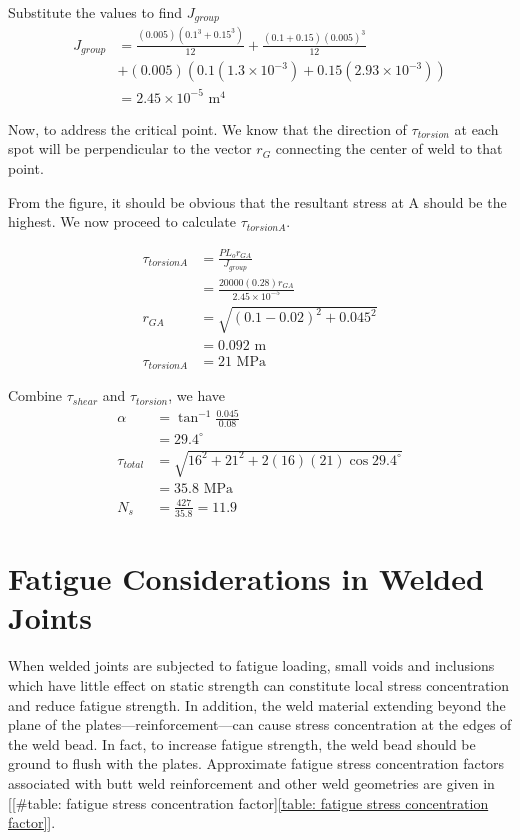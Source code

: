 \documentclass[a4paper,openany,12pt]{book}
\begin{document}
{{Substitute the values to find \(J_{group}\) $$\begin{aligned}
    J_{group} &= \frac{(0.005)(0.1^3 + 0.15^3)}{12} +\frac{(0.1 + 0.15)(0.005)^3}{12} \\
              &+ (0.005)(0.1(1.3 \times 10^{-3}) + 0.15(2.93 \times 10^{-3})) \\
              &= 2.45 \times 10^{-5} \text{ m}^4
  \end{aligned}$$

Now, to address the critical point. We know that the direction of
\(\tau_{torsion}\) at each spot will be perpendicular to the vector \(r_G\)
connecting the center of weld to that point.

From the figure, it should be obvious that the resultant stress at A
should be the highest. We now proceed to calculate \(\tau_{torsionA}\).

$$\begin{aligned}
    \tau_{torsionA} &= \frac{P L_o r_{GA}}{J_{group}} \\
                    &=\frac{20000(0.28) r_{GA}}{2.45 \times 10^{-5}} \\[1em]
    r_{GA} &= \sqrt{(0.1 - 0.02)^2 + 0.045^2} \\
                    &= 0.092 \text{ m} \\[1em]
    \tau_{torsionA} &= 21 \text{ MPa}
  \end{aligned}$$

Combine \(\tau_{shear}\) and \(\tau_{torsion}\), we have $$\begin{aligned}
    \alpha &= \tan^{-1} \frac{0.045}{0.08} \\
           &= 29.4^{\circ} \\[1em]
    \tau_{total} &= \sqrt{ 16^2 + 21^2 + 2(16)(21) \cos 29.4^{\circ} } \\
           &= 35.8 \text{ MPa} \\[1em]
    N_s &= \frac{427}{35.8} = 11.9
  \end{aligned}$$

\section{Fatigue Considerations in Welded Joints}
\label{fatigue-considerations-in-welded-joints}
When welded joints are subjected to fatigue loading, small voids and
inclusions which have little effect on static strength can constitute
local stress concentration and reduce fatigue strength. In addition, the
weld material extending beyond the plane of the
plates---reinforcement---can cause stress concentration at the edges of
the weld bead. In fact, to increase fatigue strength, the weld bead
should be ground to flush with the plates. Approximate fatigue stress
concentration factors associated with butt weld reinforcement and other
weld geometries are given in
[[\#table: fatigue stress concentration factor]\ref{table: fatigue stress concentration factor}].


}}
\end{document}
